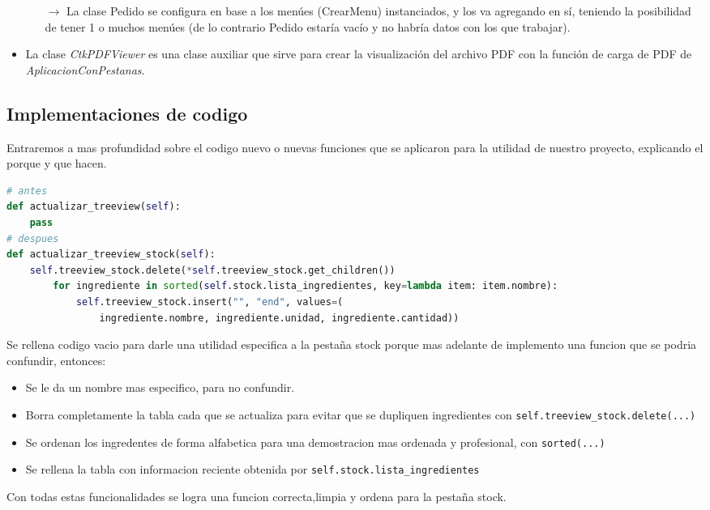 \documentclass[a4paper,12pt]{article}
\begin{document}
\begin{itemize}
\begin{itemize}
            \item[$\rightarrow$] La clase Pedido se configura en base a los menúes (CrearMenu) instanciados, y los va agregando en sí, teniendo la posibilidad de tener 1 o muchos menúes (de lo contrario Pedido estaría vacío y no habría datos con los que trabajar).
        \end{itemize}
    \item La clase \textit{CtkPDFViewer} es una clase auxiliar que sirve para crear la visualización del archivo PDF con la función de carga de PDF de \textit{AplicacionConPestanas}.
\end{itemize}


\subsection{Implementaciones de codigo}

Entraremos a mas profundidad sobre el codigo nuevo o nuevas funciones que se aplicaron para la utilidad de nuestro proyecto, explicando el porque y que hacen.

\begin{lstlisting}[language=Python, caption={Implementaciones de codigo}, frame=single]
# antes
def actualizar_treeview(self):
    pass
# despues
def actualizar_treeview_stock(self):
    self.treeview_stock.delete(*self.treeview_stock.get_children())
        for ingrediente in sorted(self.stock.lista_ingredientes, key=lambda item: item.nombre):
            self.treeview_stock.insert("", "end", values=(
                ingrediente.nombre, ingrediente.unidad, ingrediente.cantidad))
\end{lstlisting}

Se rellena codigo vacio para darle una utilidad especifica a la pestaña stock porque mas adelante de implemento una funcion que se podria confundir, entonces:

\newpage

\begin{itemize}
    \item Se le da un nombre mas especifico, para no confundir.
    \item Borra completamente la tabla cada que se actualiza para evitar que se dupliquen ingredientes con \verb|self.treeview_stock.delete(...)|
    \item Se ordenan los ingredentes de forma alfabetica para una demostracion mas ordenada y profesional, con \verb|sorted(...)|
    \item Se rellena la tabla con informacion reciente obtenida por \verb|self.stock.lista_ingredientes|
\end{itemize}
Con todas estas funcionalidades se logra una funcion correcta,limpia y ordena para la pestaña stock.
\end{document}

